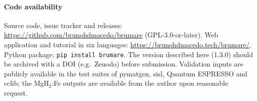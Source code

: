 \IfFileExists{SciPost.cls}{\documentclass{SciPost}\def\BMRbst{SciPost_bibstyle}}{%
\def\BMRbst{unsrtnat}}
\begin{document}
\paragraph{Code availability} Source code, issue tracker and releases: \url{https://github.com/brunohdmacedo/brumare} (GPL-3.0-or-later). Web application and tutorial in six languages: \url{https://brunohdmacedo.tech/brumare/}. Python package: \texttt{pip install brumare}. The version described here (1.3.0) should be archived with a DOI (e.g.\ Zenodo) before submission. Validation inputs are publicly available in the test suites of pymatgen, sisl, Quantum ESPRESSO and cclib; the MgH$_2$:Fe outputs are available from the author upon reasonable request.
\begin{appendix}

\end{appendix}


\end{document}
